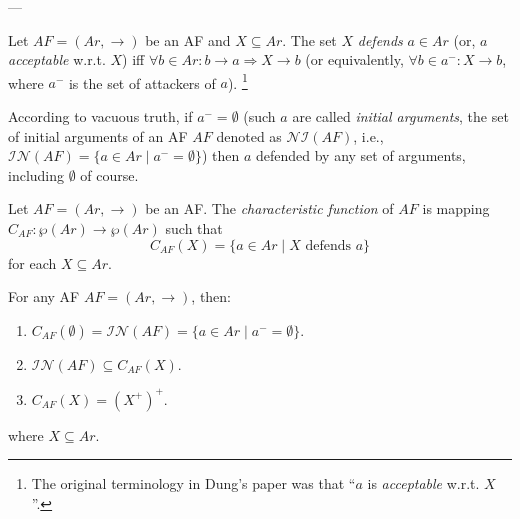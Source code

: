---


\begin{df}[Defense]
    Let $AF=(Ar,\to)$ be an AF and $X \subseteq Ar$. 
    The set $X$ \textit{defends} $a \in Ar$ 
    (or, $a$ \textit{acceptable} w.r.t. $X$) 
    iff 
    $\forall b \in Ar:b \to a \Rightarrow X \to b$
    (or equivalently, $\forall b \in a^- : X \to b$, 
    where $a^-$ is the set of attackers of $a$).
    \footnote{
        The original terminology in Dung's paper \cite{Dun1995} was that ``$a$ is \textit{acceptable} w.r.t. $X$''.
    }
\end{df}




According to vacuous truth,
if $a^- = \emptyset$
(such $a$ are called \textit{initial arguments}, 
the set of initial arguments of an AF $AF$ denoted as $\mathcal{NI}(AF)$, i.e., 
$\mathcal{IN}(AF) =  \{a \in Ar \mid a^- = \emptyset\}$)
then $a$ defended by any set of arguments, 
including $\emptyset$ of course.




\begin{df}
    Let $AF=(Ar,\to)$ be an AF. 
    The \textit{characteristic function} of $AF$ is mapping 
    $C_{AF} \colon \wp(Ar) \to \wp(Ar)$ such that 
    \[
        C_{AF} (X) 
            = 
        \{a \in Ar \mid X \text{~defends~} a\}
    \]
    for each $X \subseteq Ar$. 
\end{df}



\begin{prop} 
    For any AF $AF=(Ar,\to)$, 
    then:
    \begin{enumerate}[itemsep=5pt,parsep=5pt,leftmargin=3em,topsep=5pt,label=(\arabic*)] %
        \item $C_{AF}(\emptyset)=\mathcal{IN}(AF)=\{a \in Ar \mid a^- = \emptyset\}$.
        

        \item $\mathcal{IN}(AF) \subseteq C_{AF}(X)$.


        \item $C_{AF}(X) = (X^+)^+$.
    \end{enumerate}
    where $X \subseteq Ar$.
\end{prop}




